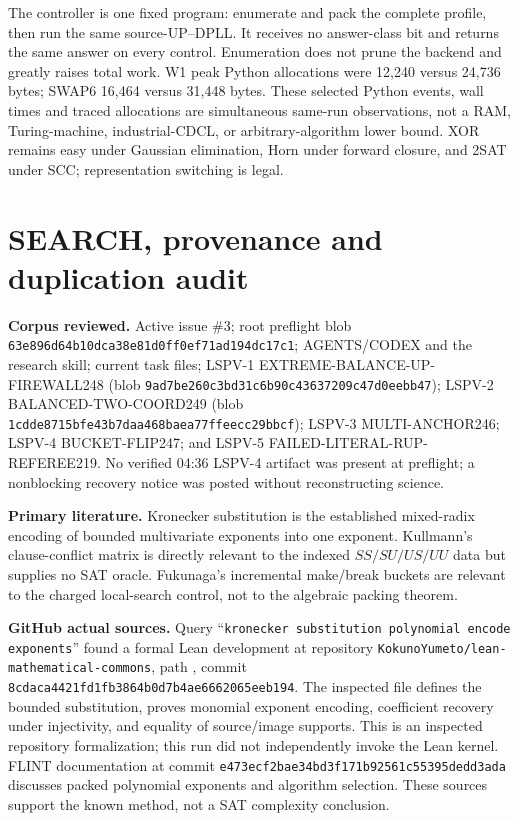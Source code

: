 \documentclass[10pt]{article}
\begin{document}
The controller is one fixed program: enumerate and pack the complete profile,
then run the same source-UP--DPLL.  It receives no answer-class bit and returns
the same answer on every control.  Enumeration does not prune the backend and
greatly raises total work.  W1 peak Python allocations were 12,240 versus
24,736 bytes; SWAP6 16,464 versus 31,448 bytes.  These selected Python events,
wall times and traced allocations are simultaneous same-run observations,
not a RAM, Turing-machine, industrial-CDCL, or arbitrary-algorithm lower
bound.  XOR remains easy under Gaussian elimination, Horn under forward
closure, and 2SAT under SCC; representation switching is legal.

\section{SEARCH, provenance and duplication audit}
\textbf{Corpus reviewed.}  Active issue \#3; root  preflight
blob \texttt{63e896d64b10dca38e81d0ff0ef71ad194dc17c1}; AGENTS/CODEX and the
research skill; current task files; LSPV-1
EXTREME-BALANCE-UP-FIREWALL248 (blob
\texttt{9ad7be260c3bd31c6b90c43637209c47d0eebb47}); LSPV-2
BALANCED-TWO-COORD249 (blob
\texttt{1cdde8715bfe43b7daa468baea77ffeecc29bbcf}); LSPV-3 MULTI-ANCHOR246;
LSPV-4 BUCKET-FLIP247; and LSPV-5 FAILED-LITERAL-RUP-REFEREE219.  No verified
04:36 LSPV-4 artifact was present at preflight; a nonblocking recovery notice
was posted without reconstructing science.

\textbf{Primary literature.}  Kronecker substitution is the established
mixed-radix encoding of bounded multivariate exponents into one exponent.
Kullmann's clause-conflict matrix is directly relevant to the indexed
$SS/SU/US/UU$ data but supplies no SAT oracle.  Fukunaga's incremental
make/break buckets are relevant to the charged local-search control, not to
the algebraic packing theorem.

\textbf{GitHub actual sources.}  Query
``\texttt{kronecker substitution polynomial encode exponents}'' found a
formal Lean development at repository
\texttt{KokunoYumeto/lean-mathematical-commons}, path
,
commit \texttt{8cdaca4421fd1fb3864b0d7b4ae6662065eeb194}.  The inspected file defines
the bounded substitution, proves monomial exponent encoding, coefficient
recovery under injectivity, and equality of source/image supports.  This is
an inspected repository formalization; this run did not independently invoke
the Lean kernel.  FLINT documentation at commit
\texttt{e473ecf2bae34bd3f171b92561c55395dedd3ada} discusses packed polynomial
exponents and algorithm selection.  These sources support the known method,
not a SAT complexity conclusion.
\end{document}

